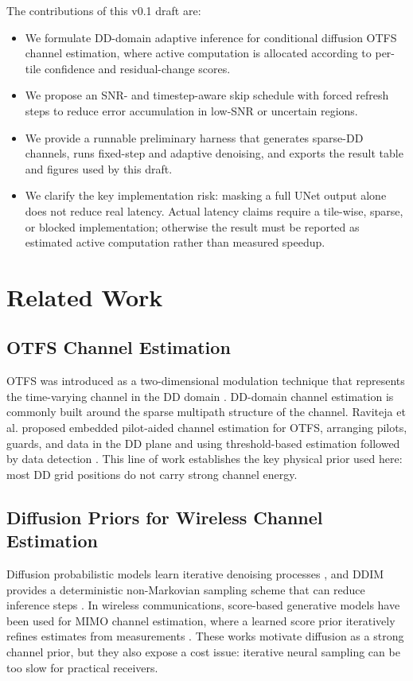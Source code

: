 \documentclass[10pt,journal]{IEEEtran}
\begin{document}
The contributions of this v0.1 draft are:
\begin{itemize}
  \item We formulate DD-domain adaptive inference for conditional diffusion
  OTFS channel estimation, where active computation is allocated according to
  per-tile confidence and residual-change scores.
  \item We propose an SNR- and timestep-aware skip schedule with forced refresh
  steps to reduce error accumulation in low-SNR or uncertain regions.
  \item We provide a runnable preliminary harness that generates sparse-DD
  channels, runs fixed-step and adaptive denoising, and exports the result
  table and figures used by this draft.
  \item We clarify the key implementation risk: masking a full UNet output
  alone does not reduce real latency. Actual latency claims require a tile-wise,
  sparse, or blocked implementation; otherwise the result must be reported as
  estimated active computation rather than measured speedup.
\end{itemize}

\section{Related Work}

\subsection{OTFS Channel Estimation}

OTFS was introduced as a two-dimensional modulation technique that represents
the time-varying channel in the DD domain \cite{hadani2017otfs}. DD-domain
channel estimation is commonly built around the sparse multipath structure of
the channel. Raviteja et al. proposed embedded pilot-aided channel estimation
for OTFS, arranging pilots, guards, and data in the DD plane and using
threshold-based estimation followed by data detection \cite{raviteja2019otfs_ce}.
This line of work establishes the key physical prior used here: most DD grid
positions do not carry strong channel energy.

\subsection{Diffusion Priors for Wireless Channel Estimation}

Diffusion probabilistic models learn iterative denoising processes
\cite{ho2020ddpm}, and DDIM provides a deterministic non-Markovian sampling
scheme that can reduce inference steps \cite{song2021ddim}. In wireless
communications, score-based generative models have been used for MIMO channel
estimation, where a learned score prior iteratively refines estimates from
measurements \cite{arvinte2023score_channel}. These works motivate diffusion
as a strong channel prior, but they also expose a cost issue: iterative neural
sampling can be too slow for practical receivers.
\end{document}
